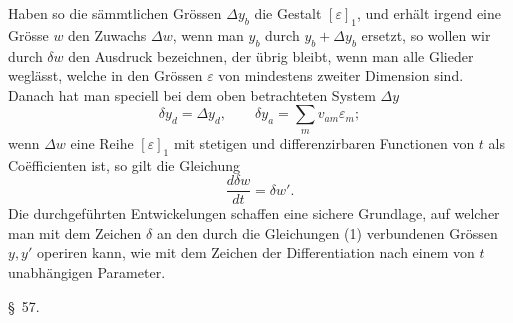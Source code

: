 \documentclass[11pt,a4paper,leqno]{article}
\begin{document}
Haben so die sämmtlichen Grössen $\Delta y_b$ die Gestalt
$[\varepsilon]_1$, und erhält irgend eine Grösse $w$ den Zuwachs
$\Delta w$, wenn man $y_b$ durch $y_b+\Delta y_b$ ersetzt, so wollen wir
durch $\delta w$ den Ausdruck bezeichnen, der übrig bleibt, wenn man
alle Glieder weglässt, welche in den Grössen $\varepsilon$ von mindestens
zweiter Dimension sind. Danach hat man speciell bei dem oben betrachteten
System $\Delta y$
\[
\delta y_d=\Delta y_d,\qquad
\delta y_a=\sum_m v_{am}\varepsilon_m;
\]
wenn $\Delta w$ eine Reihe $[\varepsilon]_1$ mit stetigen und
differenzirbaren Functionen von $t$ als Coëfficienten ist, so gilt die
Gleichung
\[
\frac{d\delta w}{dt}=\delta w'.
\]
Die durchgeführten Entwickelungen schaffen eine sichere Grundlage, auf
welcher man mit dem Zeichen $\delta$ an den durch die Gleichungen (1)
verbundenen Grössen $y,y'$ operiren kann, wie mit dem Zeichen der
Differentiation nach einem von $t$ unabhängigen Parameter.



\begin{center}
{\large \S~57.}
\end{center}
\end{document}

